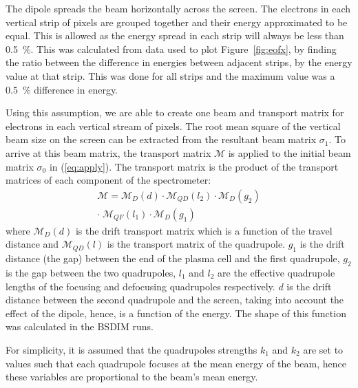 The dipole spreads the beam horizontally across the screen. The electrons in
each vertical strip of pixels are grouped together and their energy approximated
to be equal. This is allowed as the energy spread in each strip will always be
less than \SI{0.5}{\percent}. This was calculated from data used to plot
Figure~\ref{fig:eofx}, by finding the ratio between the difference in energies
between adjacent strips, by the energy value at that strip. This was done for
all strips and the maximum value was a \SI{0.5}{\percent} difference in energy.

Using this assumption, we are able to create one beam and transport matrix for
electrons in each vertical stream of pixels. The root mean square of the
vertical beam size on the screen can be extracted from the resultant beam matrix
\(\sigma_1\). To arrive at this beam matrix, the transport matrix
\(\mathcal{M}\) is applied to the initial beam matrix \(\sigma_0\) in
(\ref{eq:apply}). The transport matrix is the product of the transport matrices
of each component of the spectrometer:
\begin{equation}
	\begin{split}
		\mathcal{M} = \mathcal{M}_D(d) \cdot \mathcal{M}_{QD}(l_2) \cdot
		\mathcal{M}_D(g_2) \\
		\cdot\;\mathcal{M}_{QF}(l_1) \cdot \mathcal{M}_D(g_1)
	\end{split}
\end{equation}
where \(\mathcal{M}_D(d)\) is the drift transport matrix which is a function of
the travel distance and \(\mathcal{M}_{QD}(l)\) is the transport matrix of the
quadrupole. \(g_1\) is the drift distance (the gap) between the end of the
plasma cell and the first quadrupole, \(g_2\) is the gap between the two
quadrupoles, \(l_1\) and \(l_2\) are the effective quadrupole lengths of the
focusing and defocusing quadrupoles respectively. \(d\) is the drift distance
between the second quadrupole and the screen, taking into account the effect of
the dipole, hence, is a function of the energy. The shape of this function was
calculated in the BSDIM runs.

For simplicity, it is assumed that the quadrupoles strengths \(k_1\) and \(k_2\)
are set to values such that each quadrupole focuses at the mean energy of the
beam, hence these variables are proportional to the beam's mean energy.


